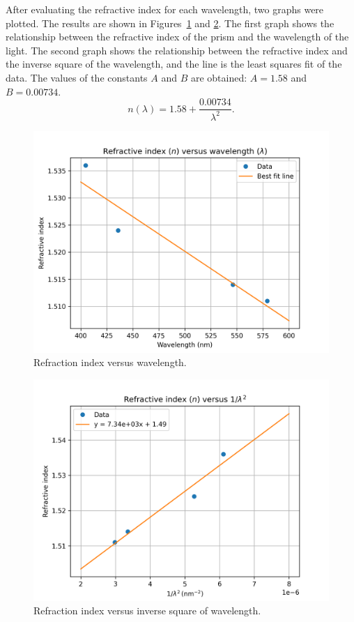 \documentclass[10pt]{article}
\begin{document}
After evaluating the refractive index for each wavelength, two graphs were plotted. The results are shown in Figures~\ref{fig:2} and \ref{fig:3}. The first graph shows the relationship between the refractive index of the prism and the wavelength of the light. The second graph shows the relationship between the refractive index and the inverse square of the wavelength, and the line is the least squares fit of the data. The values of the constants $A$ and $B$ are obtained: $A = 1.58$ and $B = 0.00734$.
\begin{equation}
    n(\lambda) = 1.58 + \dfrac{0.00734}{\lambda^2}.
\end{equation}

\begin{figure}[ht]
    \centering
    \includegraphics[scale=0.7]{figures/f2.png}
    \caption{Refraction index versus wavelength.}
    \label{fig:2}
\end{figure}

\begin{figure}[ht]
    \centering
    \includegraphics[scale=0.7]{figures/f3.png}
    \caption{Refraction index versus inverse square of wavelength.}
    \label{fig:3}
\end{figure}
\end{document}
